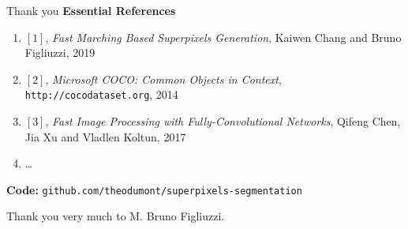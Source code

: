 \documentclass[9pt]{beamer}
\begin{document}
\begin{frame}{Thank you}
\textbf{Essential References}
    \begin{enumerate}
        \item[] $[1]$, \textit{Fast Marching Based Superpixels Generation}, Kaiwen Chang and Bruno Figliuzzi, 2019
        \item[] $[2]$, \textit{Microsoft COCO: Common Objects in Context}, \texttt{http://cocodataset.org}, 2014
        \item[] $[3]$, \textit{Fast Image Processing with Fully-Convolutional Networks}, Qifeng Chen, Jia Xu and Vladlen Koltun, 2017
        \item[] \ldots
    \end{enumerate}

\vspace{5mm}
\textbf{Code:} \texttt{github.com/theodumont/superpixels-segmentation}

\vspace{20mm}
\centering
    Thank you very much to M. Bruno Figliuzzi.
\end{frame}
\end{document}
